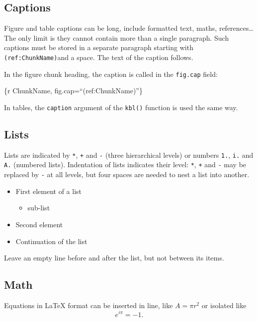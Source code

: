 \documentclass[fleqn,10pt]{latex/stylish_article} %
\providecommand{\tightlist}{%
  \setlength{\itemsep}{0pt}\setlength{\parskip}{0pt}}
\begin{document}
\subsection{Captions}\label{captions}

Figure and table captions can be long, include formatted text, maths, references\ldots{}
The only limit is they cannot contain more than a single paragraph.
Such captions must be stored in a separate paragraph starting with \texttt{(ref:ChunkName)}and a space.
The text of the caption follows.

In the figure chunk heading, the caption is called in the \texttt{fig.cap} field:

\{r ChunkName, fig.cap=\enquote{(ref:ChunkName)}\}

In tables, the \texttt{caption} argument of the \texttt{kbl()} function is used the same way.

\subsection{Lists}\label{lists}

Lists are indicated by \texttt{*}, \texttt{+} and \texttt{-} (three hierarchical levels) or numbers \texttt{1.}, \texttt{i.} and \texttt{A.} (numbered lists).
Indentation of lists indicates their level: \texttt{*}, \texttt{+} and \texttt{-} may be replaced by \texttt{-} at all levels, but four spaces are needed to nest a list into another.

\begin{itemize}
\tightlist
\item
  First element of a list

  \begin{itemize}
  \tightlist
  \item
    sub-list
  \end{itemize}
\item
  Second element
\item
  Continuation of the list
\end{itemize}

Leave an empty line before and after the list, but not between its items.

\subsection{Math}\label{math}

Equations in LaTeX format can be inserted in line, like \(A=\pi r^2\) or isolated like \[e^{i \pi} = -1.\]
\end{document}

